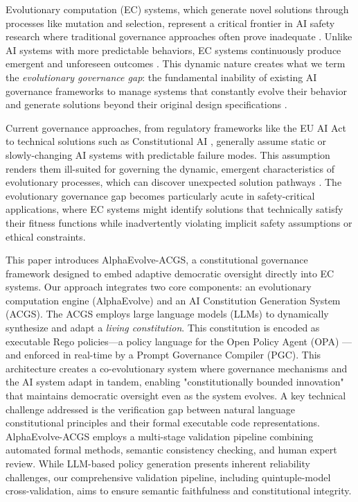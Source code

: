 \documentclass[manuscript,screen,review,anonymous,9pt]{acmart}
\begin{document}
Evolutionary computation (EC) systems, which generate novel solutions through processes like mutation and selection, represent a critical frontier in AI safety research where traditional governance approaches often prove inadequate \cite{Chauhan2025ECLLMSurvey}. Unlike AI systems with more predictable behaviors, EC systems continuously produce emergent and unforeseen outcomes \cite{Nordin2024LLMGP}. This dynamic nature creates what we term the \textit{evolutionary governance gap}: the fundamental inability of existing AI governance frameworks to manage systems that constantly evolve their behavior and generate solutions beyond their original design specifications \cite{Taeihagh2025Governing, WorldBank2024AIGovernance}.

Current governance approaches, from regulatory frameworks like the EU AI Act to technical solutions such as Constitutional AI \cite{Bai2025ConstitutionalAI}, generally assume static or slowly-changing AI systems with predictable failure modes. This assumption renders them ill-suited for governing the dynamic, emergent characteristics of evolutionary processes, which can discover unexpected solution pathways \cite{StanfordJBLP2024AIGovernanceWeb3, StanfordLaw2025BulletProof}. The evolutionary governance gap becomes particularly acute in safety-critical applications, where EC systems might identify solutions that technically satisfy their fitness functions while inadvertently violating implicit safety assumptions or ethical constraints.

This paper introduces AlphaEvolve-ACGS, a constitutional governance framework designed to embed adaptive democratic oversight directly into EC systems. Our approach integrates two core components: an evolutionary computation engine (AlphaEvolve) and an AI Constitution Generation System (ACGS). The ACGS employs large language models (LLMs) to dynamically synthesize and adapt a \textit{living constitution}. This constitution is encoded as executable Rego policies—a policy language for the Open Policy Agent (OPA) \cite{Sandall2021OPAReference}—and enforced in real-time by a Prompt Governance Compiler (PGC). This architecture creates a co-evolutionary system where governance mechanisms and the AI system adapt in tandem, enabling "constitutionally bounded innovation" that maintains democratic oversight even as the system evolves. A key technical challenge addressed is the verification gap between natural language constitutional principles and their formal executable code representations. AlphaEvolve-ACGS employs a multi-stage validation pipeline combining automated formal methods, semantic consistency checking, and human expert review. While LLM-based policy generation presents inherent reliability challenges, our comprehensive validation pipeline, including quintuple-model cross-validation, aims to ensure semantic faithfulness and constitutional integrity.
\end{document}
